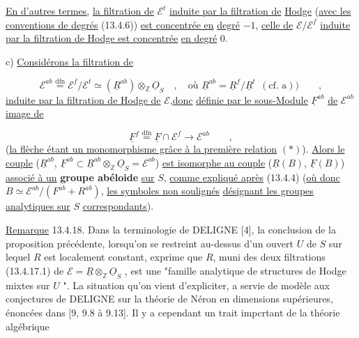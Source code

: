 
\underline{En d'autres termes,} \underline{la filtration de} $\mathcal{E}^t$ \underline{induite par la filtration de} \underline{Hodge} (\underline{avec les conventions de degrés} (13.4.6)) \underline{est concentrée en} \underline{degré} $-1$, \underline{celle de} $\mathcal{E}/\mathcal{E}^f$ \underline{induite par la filtration de Hodge est concentrée} \underline{en degré} $0$.

c) \underline{Considérons la filtration de}

\begin{equation*}
\mathcal{E}^{ab} \overset{\mathrm{dfn}}{=} \mathcal{E}^f/\mathcal{E}^t \simeq (\underline{R}^{ab}) \otimes_{\mathbb{Z}} \underline{O}_S \quad , \quad \text{où } \underline{R}^{ab} = \underline{R}^f/\underline{R}^t \ \ (\text{cf. a})) \qquad ,
\end{equation*}
\underline{induite par la filtration de Hodge de} $\mathcal{E}$,\underline{donc} \underline{définie par le sous-Module} $\underline{F}^{ab}$ \underline{de} $\mathcal{E}^{ab}$ \underline{image de}

\begin{equation*}
\underline{F}^f \overset{\mathrm{dfn}}{=} \underline{F} \cap \mathcal{E}^f \longrightarrow \mathcal{E}^{ab} \qquad ,
\end{equation*}
(\underline{la flèche étant un monomorphisme grâce à la première relation} $(*)$). \underline{Alors le couple} ($\underline{R}^{ab}$, $\underline{F}^{ab} \subset \underline{R}^{ab} \otimes_{\mathbb{Z}} \underline{O}_S = \mathcal{E}^{ab}$) \underline{est isomorphe au couple} ($\underline{R}(B)$, $\underline{F}(B)$) \underline{associé à un} \textbf{groupe abéloide} \underline{sur} $S$, \underline{comme expliqué après} (13.4.4) (\underline{où donc} $B \simeq \mathcal{E}^{ab}/(F^{ab}+ R^{ab})$, \underline{les symboles non soulignés} \underline{désignant les groupes analytiques sur} $S$ \underline{correspondants}).

\underline{Remarque} 13.4.18. Dans la terminologie de DELIGNE [4], la conclusion de la proposition précédente, lorsqu'on se restreint au-dessus d'un ouvert $U$ de $S$ sur lequel $R$ est localement constant, exprime que $R$, muni des deux filtrations (13.4.17.1) de $\mathcal{E} = \underline{R} \otimes_{\mathbb{Z}} \underline{O}_S$ , est une "famille analytique de structures de Hodge mixtes sur $U$ ". La situation qu'on vient d'expliciter, a servie de modèle aux conjectures de DELIGNE sur la théorie de Néron en dimensions supérieures, énoncées dans [9, 9.8 à 9.13]. Il y a cependant un trait impcrtant de la théorie algébrique


